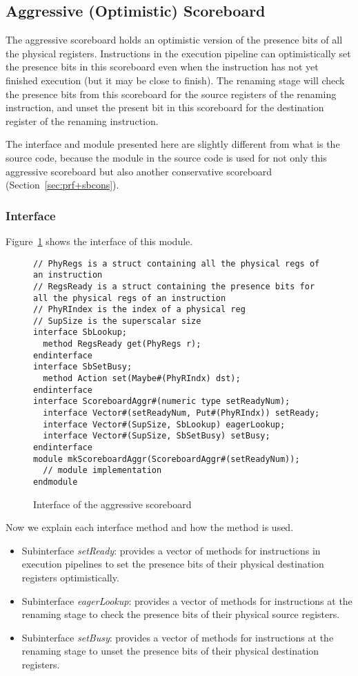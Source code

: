 \subsection{Aggressive (Optimistic) Scoreboard}\label{sec:sbaggr}

The aggressive scoreboard holds an optimistic version of the presence bits of all the physical registers.
Instructions in the execution pipeline can optimistically set the presence bits in this scoreboard even when the instruction has not yet finished execution (but it may be close to finish).
The renaming stage will check the presence bits from this scoreboard for the source registers of the renaming instruction, and unset the present bit in this scoreboard for the destination register of the renaming instruction.

The interface and module presented here are slightly different from what is the source code, because the module in the source code is used for not only this aggressive scoreboard but also another conservative scoreboard (Section~\ref{sec:prf+sbcons}).

\subsubsection{Interface}
Figure~\ref{fig:aggr-sb-ifc} shows the interface of this module.


\begin{figure}[!htb]
\begin{lstlisting}[caption={}]
// PhyRegs is a struct containing all the physical regs of an instruction
// RegsReady is a struct containing the presence bits for all the physical regs of an instruction
// PhyRIndex is the index of a physical reg
// SupSize is the superscalar size
interface SbLookup;
  method RegsReady get(PhyRegs r);
endinterface
interface SbSetBusy;
  method Action set(Maybe#(PhyRIndx) dst);
endinterface
interface ScoreboardAggr#(numeric type setReadyNum);
  interface Vector#(setReadyNum, Put#(PhyRIndx)) setReady;
  interface Vector#(SupSize, SbLookup) eagerLookup;
  interface Vector#(SupSize, SbSetBusy) setBusy;
endinterface
module mkScoreboardAggr(ScoreboardAggr#(setReadyNum));
  // module implementation
endmodule
\end{lstlisting}
\caption{Interface of the aggressive scoreboard}\label{fig:aggr-sb-ifc}
\end{figure}

Now we explain each interface method and how the method is used. 
\begin{itemize}
    \item Subinterface \emph{setReady}: provides a vector of methods for instructions in execution pipelines to set the presence bits of their physical destination registers optimistically.
    \item Subinterface \emph{eagerLookup}: provides a vector of methods for instructions at the renaming stage to check the presence bits of their physical source registers.
    \item Subinterface \emph{setBusy}: provides a vector of methods for instructions at the renaming stage to unset the presence bits of their physical destination registers.
\end{itemize}

